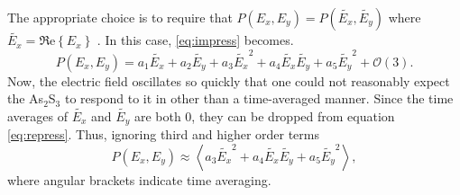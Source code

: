 \documentclass[twocolumn,showpacs,preprintnumbers,amsmath,amssymb]{revtex4}
\begin{document}
The appropriate choice is to require that $P(E_x,E_y)=P(\tilde{E_x},\tilde{E_y})$ where
$\tilde{E_x}=\Re\mathrm{e}\left\{E_x\right\}$ \cite{recht06}. In this case,
\ref{eq:impress} becomes.
\begin{equation}
P(E_x,E_y)=a_1\tilde{E_x}+a_2\tilde{E_y}+a_3\tilde{E_x}^2+a_4\tilde{E_x}\tilde{E_y}+a_5\tilde{E_y}^2+\mathcal{O}(3)
\mathrm{.} \label{eq:repress}
\end{equation}
Now, the electric field oscillates so quickly that one could not reasonably expect the
As$_2$S$_3$ to respond to it in other than a time-averaged manner. Since the time
averages of $\tilde{E_x}$ and $\tilde{E_y}$ are both 0, they can be dropped from equation
\ref{eq:repress}. Thus, ignoring third and higher order terms
\begin{equation}
P(E_x,E_y) \approx \left\langle
a_3\tilde{E_x}^2+a_4\tilde{E_x}\tilde{E_y}+a_5\tilde{E_y}^2\right\rangle \mathrm{,}
\label{eq:repress2}
\end{equation}
where angular brackets indicate time averaging.
\end{document}

